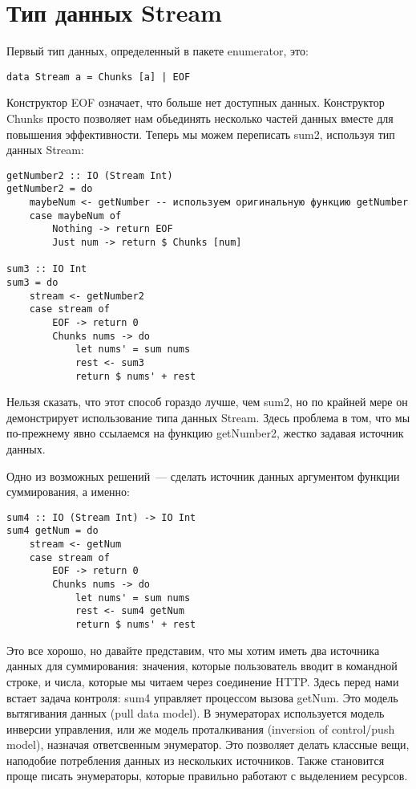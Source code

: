 \section{Тип данных Stream}

Первый тип данных, определенный в пакете enumerator, это: 

\begin{lstlisting}
data Stream a = Chunks [a] | EOF
\end{lstlisting}

Конструктор EOF означает, что больше нет доступных данных. Конструктор Chunks просто позволяет нам обьединять несколько частей данных вместе для повышения эффективности. Теперь мы можем переписать sum2, используя тип данных Stream:

\begin{lstlisting}
getNumber2 :: IO (Stream Int)
getNumber2 = do
    maybeNum <- getNumber -- используем оригинальную функцию getNumber
    case maybeNum of
        Nothing -> return EOF
        Just num -> return $ Chunks [num]

sum3 :: IO Int
sum3 = do
    stream <- getNumber2
    case stream of
        EOF -> return 0
        Chunks nums -> do
            let nums' = sum nums
            rest <- sum3
            return $ nums' + rest
\end{lstlisting}%

Нельзя сказать, что этот способ гораздо лучше, чем sum2, но по крайней мере он демонстрирует использование типа данных Stream. Здесь проблема в том, что мы по-прежнему явно ссылаемся на функцию getNumber2, жестко задавая источник данных.

Одно из возможных решений~--- сделать источник данных аргументом функции суммирования, а именно:

\begin{lstlisting}
sum4 :: IO (Stream Int) -> IO Int
sum4 getNum = do
    stream <- getNum
    case stream of
        EOF -> return 0
        Chunks nums -> do
            let nums' = sum nums
            rest <- sum4 getNum
            return $ nums' + rest
\end{lstlisting}%

Это все хорошо, но давайте представим, что мы хотим иметь два источника данных для суммирования: значения, которые пользователь вводит в командной строке, и числа, которые мы читаем через соединение HTTP. Здесь перед нами встает задача контроля: sum4 управляет процессом вызова getNum. Это модель вытягивания данных (pull data model). В энумераторах используется модель инверсии управления, или же модель проталкивания (inversion of control/push model), назначая ответсвенным энумератор. Это позволяет делать классные вещи, наподобие потребления данных из нескольких источников. Также становится проще писать энумераторы, которые правильно работают с выделением ресурсов.

